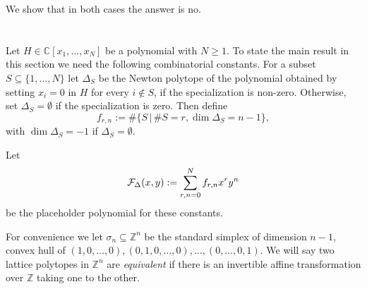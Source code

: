 \documentclass[12pt]{article}
\newcommand{\calF}{{\cal F}}
\newcommand{\Z}{{\mathbb Z}}
\newcommand{\C}{{\mathbb C}}
\begin{document}
We show that in both cases the answer is no.

\section{}
Let $H\in \C[x_1,\ldots,x_N]$ be a polynomial with
$N\geq 1$.  To state the main result in this section we need the
following combinatorial constants. For a subset $S\subseteq
\{1,\ldots,N\}$ let
$\Delta_S$ be the Newton polytope of the polynomial obtained by
setting $x_i=0$ in $H$ for every $i\notin
S$, if the specialization is non-zero. Otherwise, set
$\Delta_S=\emptyset$ if the specialization is zero. Then define
\begin{equation}
\label{f-defn}
f_{r,n}:=\#\{S \,|\, \#S=r, \dim \Delta_S=n-1\},
\end{equation}
with $\dim \Delta_S=-1$ if $\Delta_S=\emptyset$.

Let 
$$
\calF_\Delta(x,y):=\sum_{r,n=0}^Nf_{r,n}x^ry^n
$$
be the placeholder polynomial for these constants.

For convenience we let $\sigma_n\subseteq \Z^n$ be the standard
simplex of dimension $n-1$, convex hull of
$(1,0,\ldots,0),(0,1,0,\ldots,0),\ldots,(0,\ldots,0,1)$.  We will say
two lattice polytopes in $\Z^n$ are \emph{equivalent} if there is an
invertible affine transformation over $\Z$ taking one to the other.
\end{document}

